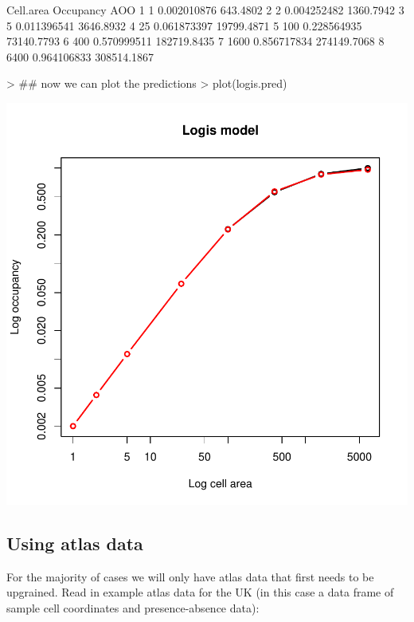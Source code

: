 \documentclass{article}[12pt, a4paper]
\begin{document}
\begin{Schunk}
\begin{Soutput}
  Cell.area   Occupancy         AOO
1         1 0.002010876    643.4802
2         2 0.004252482   1360.7942
3         5 0.011396541   3646.8932
4        25 0.061873397  19799.4871
5       100 0.228564935  73140.7793
6       400 0.570999511 182719.8435
7      1600 0.856717834 274149.7068
8      6400 0.964106833 308514.1867

\end{Soutput}
\end{Schunk}
\begin{Schunk}
\begin{Sinput}
> ## now we can plot the predictions
> plot(logis.pred)
\end{Sinput}
\end{Schunk}
\includegraphics{Downscaling-downscale6}

\subsection{Using atlas data}
For the majority of cases we will only have atlas data that first needs to be upgrained. Read in example atlas data for the UK (in this case a data frame of sample cell coordinates and presence-absence data):
\end{document}
